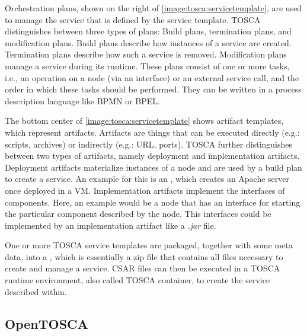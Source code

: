 Orchestration plans, shown on the right of \autoref{image:tosca:servicetemplate}, are used to manage the service that is defined by the service template. TOSCA distinguishes between three types of plans: Build plans, termination plans, and modification plans.
Build plans describe how instances of a service are created.
Termination plans describe how such a service is removed.
Modification plans manage a service during its runtime.
These plans consist of one or more tasks, i.e., an operation on a node (via an interface) or an external service call, and the order in which these tasks should be performed.
They can be written in a process description language like BPMN or BPEL.

The bottom center of \autoref{image:tosca:servicetemplate} shows artifact templates, which represent artifacts.
Artifacts are things that can be executed directly (e.g.: scripts, archives) or indirectly (e.g.: URL, ports).
TOSCA further distinguishes between two types of artifacts, namely deployment and implementation artifacts.
Deployment artifacts materialize instances of a node and are used by a build plan to create a service.
An example for this is an , which creates an Apache server once deployed in a VM.
Implementation artifacts implement the interfaces of components.
Here, an example would be a node that has an interface for starting the particular component described by the node.
This interfaces could be implemented by an implementation artifact like a \textit{.jar} file.

One or more TOSCA service templates are packaged, together with some meta data, into a , which is essentially a zip file that contains all files necessary to create and manage a service.
CSAR files can then be executed in a TOSCA runtime environment, also called TOSCA container, to create the service described within.

\subsection{OpenTOSCA}

